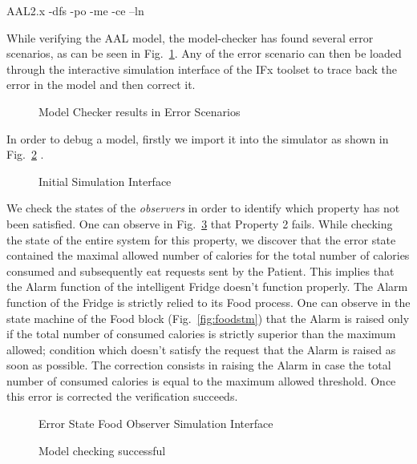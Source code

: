 \documentclass[a4paper,twoside]{article}
\begin{document}
AAL2.x -dfs -po -me -ce –ln

While verifying the AAL model, the model-checker has found several error scenarios, as can be seen in Fig.~\ref{fig:errorstate}.  Any of the error scenario can then be loaded through the interactive simulation interface of the IFx toolset to trace back the error in the model and then correct it. 

\begin{figure}[!h]
  \centering
  {}
  \caption{Model Checker results in Error Scenarios}
  \label{fig:errorstate}
 \end{figure}

In order to  debug  a model, firstly we import it into the simulator as shown in Fig.~\ref{fig:initialsimulationinterface} .

\begin{figure}[!h]
  \centering
  {}
  \caption{Initial Simulation Interface}
  \label{fig:initialsimulationinterface}
 \end{figure}

We check the states of the \textit{observers} in order to identify which property has not been satisfied. One can observe in Fig.~\ref{fig:errorstatefoodobserver} that Property 2 fails. While checking the state of the entire system for this property, we discover that the error state contained the maximal allowed number of calories for the total number of calories consumed and subsequently eat requests sent by the Patient. This implies that the Alarm function of the intelligent Fridge doesn't function properly. The Alarm function of the Fridge is strictly relied to its Food process. One can observe in the state machine of the Food block (Fig.~\ref{fig:foodstm}) that the Alarm is raised only if the total number of consumed calories is strictly superior than the maximum allowed; condition which doesn't satisfy the request that the Alarm is raised as soon as possible. The correction consists in raising the Alarm in case the total number of consumed calories is equal to the maximum allowed threshold. Once this error is corrected the verification succeeds.

\begin{figure}[!h]
  \centering
  {}
  \caption{Error State Food Observer Simulation Interface}
  \label{fig:errorstatefoodobserver}
 \end{figure}

\begin{figure}[!h]
  \centering
  {}
  \caption{Model checking successful}
  \label{fig:verificationok}
 \end{figure} 
\end{document}
